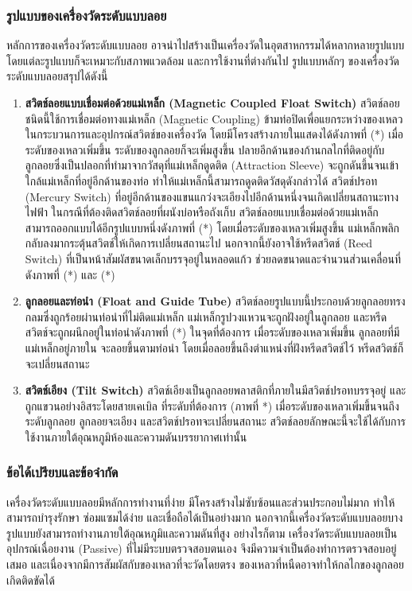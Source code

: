 \documentclass[final,11pt]{article}
\begin{document}
\subsubsection{รูปแบบของเครื่องวัดระดับแบบลอย}
หลักการของเครื่องวัดระดับแบบลอย อาจนำไปสร้างเป็นเครื่องวัดในอุตสาหกรรมได้หลากหลายรูปแบบ โดยแต่ละรูปแบบก็จะเหมาะกับสภาพแวดล้อม 
และการใช้งานที่ต่างกันไป รูปแบบหลักๆ ของเครื่องวัดระดับแบบลอยสรุปได้ดังนี้
\begin{enumerate}
    \item \textbf{สวิตช์ลอยแบบเชื่อมต่อด้วยแม่เหล็ก (Magnetic Coupled Float Switch)} สวิตช์ลอยชนิดนี้ใช้การเชื่อมต่อทางแม่เหล็ก (Magnetic Coupling)
    ข้ามท่อปิดเพื่อแยกระหว่างของเหลวในกระบวนการและอุปกรณ์สวิตช์ของเครื่องวัด โดยมีโครงสร้างภายในแสดงได้ดังภาพที่ (*)
    เมื่อระดับของเหลวเพิ่มขึ้น ระดับของลูกลอยก็จะเพิ่มสูงขึ้น ปลายอีกด้านของก้านกลไกที่ติดอยู่กับลูกลอยซึ่งเป็นปลอกที่ทำมาจากวัสดุที่แม่เหล็กดูดติด (Attraction Sleeve) 
    จะถูกดันขึ้นจนเข้าใกล้แม่เหล็กที่อยู่อีกด้านของท่อ ทำให้แม่เหล็กนี้สามารถดูดติดวัสดุดังกล่าวได้ สวิตช์ปรอท (Mercury Switch) ที่อยู่อีกด้านของแขนแกว่งจะเอียงไปอีกด้านหนึ่งจนเกิดเปลี่ยนสถานะทางไฟฟ้า
    ในกรณีที่ต้องติดสวิตช์ลอยที่ผนังบ่อหรือถังเก็บ สวิตช์ลอยแบบเชื่อมต่อด้วยแม่เหล็กสามารถออกแบบได้อีกรูปแบบหนึ่งดังภาพที่ (*) โดยเมื่อระดับของเหลวเพิ่มสูงขึ้น
    แม่เหล็กพลิกกลับลงมากระตุ้นสวิตช์ให้เกิดการเปลี่ยนสถานะไป นอกจากนี้ยังอาจใช้หรีดสวิตช์ (Reed Switch) ที่เป็นหน้าสัมผัสขนาดเล็กบรรจุอยู่ในหลอดแก้ว 
    ช่วยลดขนาดและจำนวนส่วนเคลื่อนที่ ดังภาพที่ (*) และ (*) 
    \item \textbf{ลูกลอยและท่อนำ (Float and Guide Tube)} สวิตช์ลอยรูปแบบนี้ประกอบด้วยลูกลอยทรงกลมซึ่งถูกร้อยผ่านท่อนำที่ไม่ติดแม่เหล็ก
    แม่เหล็กรูปวงแหวนจะถูกฝังอยู่ในลูกลอย และหรีดสวิตช์จะถูกผนึกอยู่ในท่อนำดังภาพที่ (*) ในจุดที่ต้องการ เมื่อระดับของเหลวเพิ่มขึ้น ลูกลอยที่มีแม่เหล็กอยู่ภายใน
    จะลอยขึ้นตามท่อนำ โดยเมื่อลอยขึ้นถึงตำแหน่งที่ฝังหรีดสวิตช์ไว้ หรีดสวิตช์ก็จะเปลี่ยนสถานะ  
    \item \textbf{สวิตช์เอียง (Tilt Switch)} สวิตช์เอียงเป็นลูกลอยพลาสติกที่ภายในมีสวิตช์ปรอทบรรจุอยู่ และถูกแขวนอย่างอิสระโดยสายเคเบิล 
    ที่ระดับที่ต้องการ (ภาพที่ *) เมื่อระดับของเหลวเพิ่มขึ้นจนถึงระดับลูกลอย ลูกลอยจะเอียง และสวิตช์ปรอทจะเปลี่ยนสถานะ 
    สวิตช์ลอยลักษณะนี้จะใช้ได้กับการใช้งานภายใต้อุณหภูมิห้องและความดันบรรยากาศเท่านั้น
\end{enumerate}

\subsubsection{ข้อได้เปรียบและข้อจำกัด}
เครื่องวัดระดับแบบลอยมีหลักการทำงานที่ง่าย มีโครงสร้างไม่ซับซ้อนและส่วนประกอบไม่มาก ทำให้สามารถบำรุงรักษา ซ่อมแซมได้ง่าย และเชื่อถือได้เป็นอย่างมาก
นอกจากนี้เครื่องวัดระดับแบบลอยบางรูปแบบยังสามารถทำงานภายใต้อุณหภูมิและความดันที่สูง อย่างไรก็ตาม เครื่องวัดระดับแบบลอยเป็นอุปกรณ์เฉื่อยงาน (Passive) 
ที่ไม่มีระบบตรวจสอบตนเอง จึงมีความจำเป็นต้องทำการตรวจสอบอยู่เสมอ และเนื่องจากมีการสัมผัสกับของเหลวที่จะวัดโดยตรง ของเหลวที่หนืดอาจทำให้กลไกของลูกลอยเกิดติดขัดได้
\end{document}
